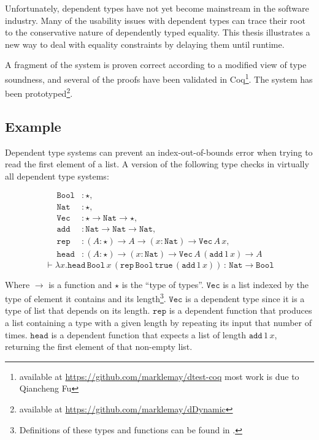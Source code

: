 Unfortunately, dependent types have not yet become mainstream in the software industry.
Many of the usability issues with dependent types can trace their root to the conservative nature of dependently typed equality.
This thesis illustrates a new way to deal with equality constraints by delaying them until runtime.

A fragment of the system is proven correct according to a modified view of type soundness, and several of the proofs have been validated in Coq\footnote{
available at \url{https://github.com/marklemay/dtest-coq} most work is due to Qiancheng Fu}.
The system has been prototyped\footnote{available at \url{https://github.com/marklemay/dDynamic}}.


\subsection{Example}

Dependent type systems can prevent an index-out-of-bounds error when trying to read the first element of a list.
A version of the following type checks in virtually all dependent type systems:


\begin{align*}
\mathtt{Bool} & : \star,\\
\mathtt{Nat} & : \star,\\
\mathtt{Vec} & :\star \rightarrow\mathtt{Nat}\rightarrow \star,\\
\mathtt{add} & :\mathtt{Nat}\rightarrow\mathtt{Nat}\rightarrow\mathtt{Nat},\\
\mathtt{rep} & :\left(A:\star\right)\rightarrow A\rightarrow\left(x:\mathtt{Nat}\right)\rightarrow\mathtt{Vec\,}A\,x,\\
\mathtt{head} & :\left(A:\star\right)\rightarrow\left(x:\mathtt{Nat}\right)\rightarrow\mathtt{Vec}\,A\,\left(\mathtt{add}\,1\,x\right)\rightarrow A
\end{align*}
\[
\vdash\lambda x.\mathtt{head}\,\mathtt{Bool}\,x\,\left(\mathtt{rep}\,\mathtt{Bool}\,\mathtt{true}\,\left(\mathtt{add}\,1\,x\right)\right)\,:\,\mathtt{Nat}\rightarrow\mathtt{Bool}
\]


Where $\rightarrow$ is a function and $\star$ is the ``type of types''.
$\mathtt{Vec}$ is a list indexed by the type of element it contains and its length\footnote{
  Definitions of these types and functions can be found in .
}.
$\mathtt{Vec}$ is a dependent type since it is a type of list that depends on its length.
$\mathtt{rep}$ is a dependent function that produces a list containing a type with a given length by repeating its input that number of times.
$\mathtt{head}$ is a dependent function that expects a list of length $\mathtt{add}\,1\,x$, returning the first element of that non-empty list.

